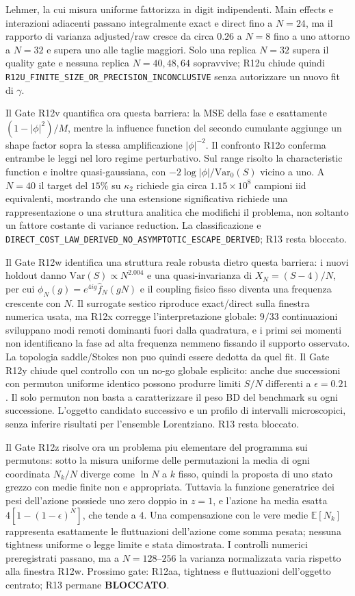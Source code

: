 \documentclass[11pt,a4paper]{article}
\begin{document}
Lehmer, la cui misura uniforme fattorizza in digit indipendenti. Main effects e interazioni adiacenti passano integralmente exact e direct fino a $N=24$, ma il rapporto di varianza adjusted/raw cresce da circa $0.26$ a $N=8$ fino a uno attorno a $N=32$ e supera uno alle taglie maggiori. Solo una replica $N=32$ supera il quality gate e nessuna replica $N=40,48,64$ sopravvive; R12u chiude quindi \texttt{R12U\_FINITE\_SIZE\_OR\_PRECISION\_INCONCLUSIVE} senza autorizzare un nuovo fit di $\gamma$.

Il Gate R12v quantifica ora questa barriera: la MSE della fase e esattamente $(1-|\phi|^2)/M$, mentre la influence function del secondo cumulante aggiunge un shape factor sopra la stessa amplificazione $|\phi|^{-2}$. Il confronto R12o conferma entrambe le leggi nel loro regime perturbativo. Sul range risolto la characteristic function e inoltre quasi-gaussiana, con $-2\log|\phi|/\mathrm{Var}_0(S)$ vicino a uno. A $N=40$ il target del $15\%$ su $\kappa_2$ richiede gia circa $1.15\times10^8$ campioni iid equivalenti, mostrando che una estensione significativa richiede una rappresentazione o una struttura analitica che modifichi il problema, non soltanto un fattore costante di variance reduction. La classificazione e \texttt{DIRECT\_COST\_LAW\_DERIVED\_NO\_ASYMPTOTIC\_ESCAPE\_DERIVED}; R13 resta bloccato.

Il Gate R12w identifica una struttura reale robusta dietro questa barriera: i nuovi holdout danno $\mathrm{Var}(S)\propto N^{2.004}$ e una quasi-invarianza di $X_N=(S-4)/N$, per cui $\phi_N(g)=e^{4ig}\widehat f_N(gN)$ e il coupling fisico fisso diventa una frequenza crescente con $N$. Il surrogate sestico riproduce exact/direct sulla finestra numerica usata, ma R12x corregge l'interpretazione globale: $9/33$ continuazioni sviluppano modi remoti dominanti fuori dalla quadratura, e i primi sei momenti non identificano la fase ad alta frequenza nemmeno fissando il supporto osservato. La topologia saddle/Stokes non puo quindi essere dedotta da quel fit. Il Gate R12y chiude quel controllo con un no-go globale esplicito: anche due successioni con permuton uniforme identico possono produrre limiti $S/N$ differenti a $\epsilon=0.21$. Il solo permuton non basta a caratterizzare il peso BD del benchmark su ogni successione. L'oggetto candidato successivo e un profilo di intervalli microscopici, senza inferire risultati per l'ensemble Lorentziano. R13 resta bloccato.


Il Gate R12z risolve ora un problema piu elementare del programma sui permutons: sotto la misura uniforme delle permutazioni la media di ogni coordinata $N_k/N$ diverge come $\ln N$ a $k$ fisso, quindi la proposta di uno stato grezzo con medie finite non e appropriata. Tuttavia la funzione generatrice dei pesi dell'azione possiede uno zero doppio in $z=1$, e l'azione ha media esatta $4[1-(1-\epsilon)^N]$, che tende a $4$. Una compensazione con le vere medie $\mathbb E[N_k]$ rappresenta esattamente le fluttuazioni dell'azione come somma pesata; nessuna tightness uniforme o legge limite e stata dimostrata. I controlli numerici preregistrati passano, ma a $N=128$--$256$ la varianza normalizzata varia rispetto alla finestra R12w. Prossimo gate: R12aa, tightness e fluttuazioni dell'oggetto centrato; R13 permane \textbf{BLOCCATO}.
\end{document}
